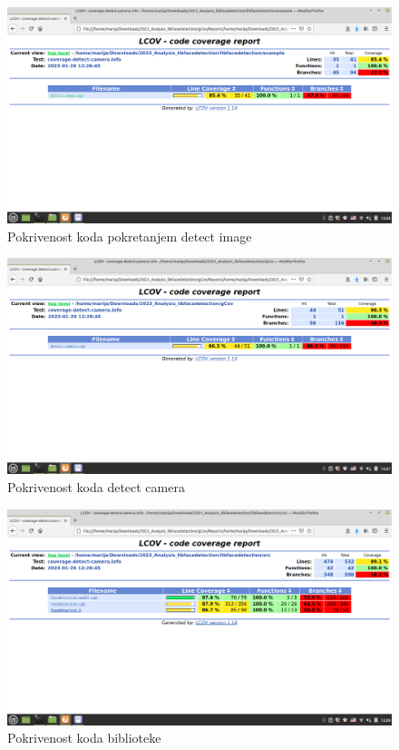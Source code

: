 \documentclass{article}
\begin{document}

\begin{figure}[H]
    \centering
    \includegraphics[width=12cm]{img/gcov/gcovDI.png}
    \caption{Pokrivenost koda pokretanjem detect image}
    \label{di:gcov}
\end{figure}
\begin{figure}[H]
    \centering
    \includegraphics[width=12cm]{img/gcov/gcovDC.png}
    \caption{Pokrivenost koda detect camera}
    \label{dc:gcov}
\end{figure}
\begin{figure}[H]
    \centering
    \includegraphics[width=12cm]{img/gcov/gcovSRC.png}
    \caption{Pokrivenost koda biblioteke }
    \label{src:gcov}
\end{figure}
\end{document}
